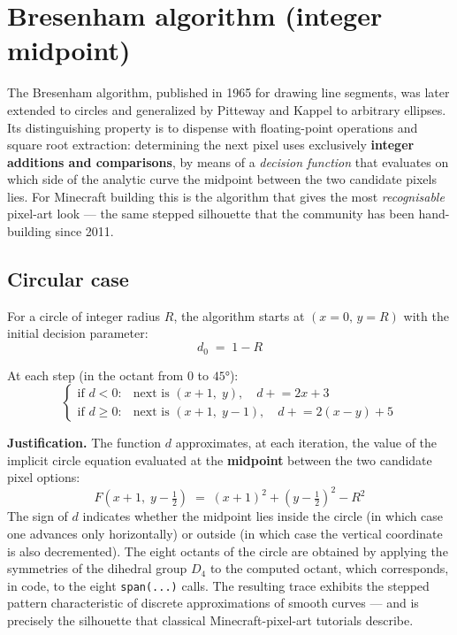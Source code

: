 \documentclass[12pt,a4paper]{scrartcl}
\newcommand{\code}[1]{\texttt{\small #1}}
\newcommand{\acc}[1]{\textcolor{accent}{\textbf{#1}}}
\begin{document}
\section{Bresenham algorithm (integer midpoint)}

The Bresenham algorithm, published in 1965 for drawing line segments, was later extended to circles and generalized by Pitteway and Kappel to arbitrary ellipses. Its distinguishing property is to dispense with floating-point operations and square root extraction: determining the next pixel uses exclusively \acc{integer additions and comparisons}, by means of a \emph{decision function} that evaluates on which side of the analytic curve the midpoint between the two candidate pixels lies. For Minecraft building this is the algorithm that gives the most \emph{recognisable} pixel-art look --- the same stepped silhouette that the community has been hand-building since 2011.

\subsection{Circular case}

For a circle of integer radius $R$, the algorithm starts at $(x{=}0,\,y{=}R)$ with the initial decision parameter:
\[
d_0 \;=\; 1 - R
\]

At each step (in the octant from $0$ to $45°$):
\[
\begin{cases}
\text{if } d < 0: & \text{next is } (x{+}1,\;y), \quad d \mathrel{+}= 2x+3 \\[2pt]
\text{if } d \geq 0: & \text{next is } (x{+}1,\;y{-}1), \quad d \mathrel{+}= 2(x-y)+5
\end{cases}
\]

\textbf{Justification.} The function $d$ approximates, at each iteration, the value of the implicit circle equation evaluated at the \acc{midpoint} between the two candidate pixel options:
\[
F\!\left(x+1,\;y-\tfrac{1}{2}\right) \;=\; (x+1)^2 + \left(y-\tfrac{1}{2}\right)^{\!2} - R^2
\]
The sign of $d$ indicates whether the midpoint lies inside the circle (in which case one advances only horizontally) or outside (in which case the vertical coordinate is also decremented). The eight octants of the circle are obtained by applying the symmetries of the dihedral group $D_4$ to the computed octant, which corresponds, in code, to the eight \code{span(...)} calls. The resulting trace exhibits the stepped pattern characteristic of discrete approximations of smooth curves --- and is precisely the silhouette that classical Minecraft-pixel-art tutorials describe.
\end{document}
